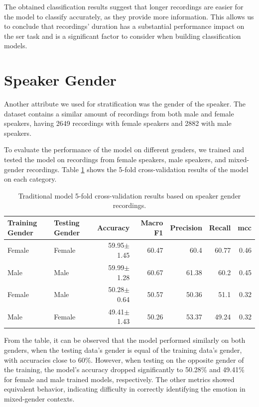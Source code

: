 The obtained classification results suggest that longer recordings are easier for the model to classify accurately, as they provide more information. This allows us to conclude that recordings' duration has a substantial performance impact on the \ac{ser} task and is a significant factor to consider when building classification models.

\section{Speaker Gender}

Another attribute we used for stratification was the gender of the speaker. The dataset contains a similar amount of recordings from both male and female speakers, having 2649 recordings with female speakers and 2882 with male speakers.

To evaluate the performance of the model on different genders, we trained and tested the model on recordings from female speakers, male speakers, and mixed-gender recordings. Table \ref{5:gender} shows the 5-fold cross-validation results of the model on each category.

\begin{table}[H]
	\centering
	\caption{Traditional model 5-fold cross-validation results based on speaker gender recordings.}
	\label{5:gender}
	\begin{tabular}{llrrrrr}
		\toprule
		Training Gender & Testing Gender & Accuracy    &   Macro F1 &   Precision &   Recall &   \ac{mcc} \\
		\midrule
		Female 	& Female & 59.95$\pm$1.45 & 60.47 &       60.4  &    60.77 &   0.46 \\
		Male 	& Male   & 59.99$\pm$1.28 & 60.67 &       61.38 &    60.2  &   0.45 \\
		
		\addlinespace

		Female  & Male	 & 50.28$\pm$0.64 &  50.57 &       50.36 &    51.1  &   0.32 \\
		Male    & Female & 49.41$\pm$1.43 &  50.26 &       53.37 &    49.24 &   0.32 \\
		\bottomrule
	\end{tabular}
\end{table}

From the table, it can be observed that the model performed similarly on both genders, when the testing data's gender is equal of the training data's gender, with accuracies close to 60\%. However, when testing on the opposite gender of the training, the model's accuracy dropped significantly to 50.28\% and 49.41\% for female and male trained models, respectively. The other metrics showed equivalent behavior, indicating difficulty in correctly identifying the emotion in mixed-gender contexts.

